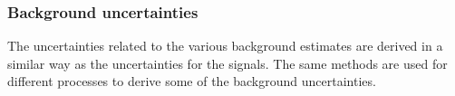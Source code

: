 \subsubsection{Background uncertainties}
The uncertainties related to the various background estimates are derived in a similar way as the uncertainties for the signals.  
The same methods are used for different processes to derive some of the background uncertainties. 
